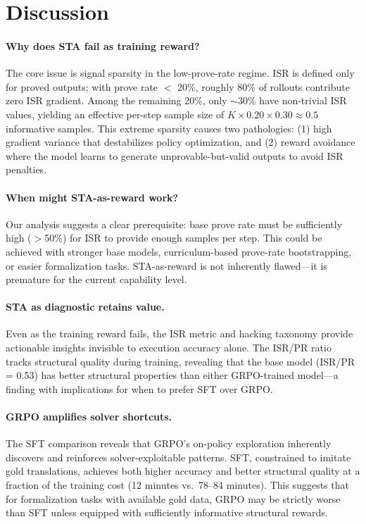 \documentclass[11pt,a4paper]{article}
\begin{document}
\section{Discussion}

\paragraph{Why does STA fail as training reward?}
The core issue is signal sparsity in the low-prove-rate regime.
ISR is defined only for proved outputs; with prove rate $<$ 20\%, roughly 80\% of rollouts contribute zero ISR gradient.
Among the remaining 20\%, only $\sim$30\% have non-trivial ISR values, yielding an effective per-step sample size of $K \times 0.20 \times 0.30 \approx 0.5$ informative samples.
This extreme sparsity causes two pathologies: (1) high gradient variance that destabilizes policy optimization, and (2) reward avoidance where the model learns to generate unprovable-but-valid outputs to avoid ISR penalties.

\paragraph{When might STA-as-reward work?}
Our analysis suggests a clear prerequisite: base prove rate must be sufficiently high ($>$50\%) for ISR to provide enough samples per step.
This could be achieved with stronger base models, curriculum-based prove-rate bootstrapping, or easier formalization tasks.
STA-as-reward is not inherently flawed---it is premature for the current capability level.

\paragraph{STA as diagnostic retains value.}
Even as the training reward fails, the ISR metric and hacking taxonomy provide actionable insights invisible to execution accuracy alone.
The ISR/PR ratio tracks structural quality during training, revealing that the base model (ISR/PR = 0.53) has better structural properties than either GRPO-trained model---a finding with implications for when to prefer SFT over GRPO.

\paragraph{GRPO amplifies solver shortcuts.}
The SFT comparison reveals that GRPO's on-policy exploration inherently discovers and reinforces solver-exploitable patterns.
SFT, constrained to imitate gold translations, achieves both higher accuracy and better structural quality at a fraction of the training cost (12 minutes vs.\ 78--84 minutes).
This suggests that for formalization tasks with available gold data, GRPO may be strictly worse than SFT unless equipped with sufficiently informative structural rewards.
\end{document}
